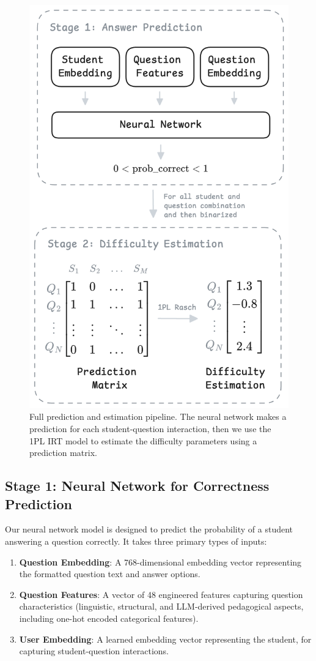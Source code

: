\documentclass[
    a4paper, %
    10pt, %
    twoside, %
]{LTJournalArticle}
\begin{document}
\begin{figure}[H]
    \centering
    \includegraphics[width=0.8\columnwidth]{figures/full-model.png}
    \caption{Full prediction and estimation pipeline. The neural network makes a prediction for each student-question interaction, then we use the 1PL IRT model to estimate the difficulty parameters using a prediction matrix.}
    \label{fig:model-pipeline}
\end{figure}


\subsection{Stage 1: Neural Network for Correctness Prediction}
Our neural network model is designed to predict the probability of a student answering a question correctly. It takes three primary types of inputs:

\begin{enumerate}
    \item \textbf{Question Embedding}: A 768-dimensional embedding vector representing the formatted question text and answer options.
    \item \textbf{Question Features}: A vector of 48 engineered features capturing question characteristics (linguistic, structural, and LLM-derived pedagogical aspects, including one-hot encoded categorical features).
    \item \textbf{User Embedding}: A learned embedding vector representing the student, for capturing student-question interactions.
\end{enumerate}
\end{document}
